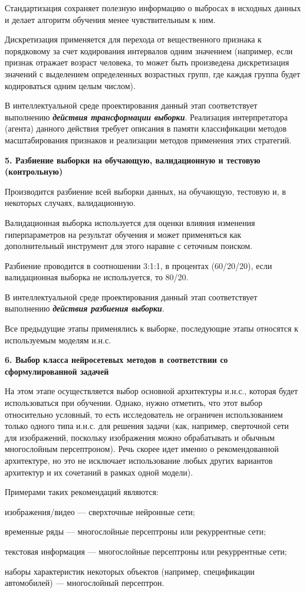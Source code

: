 Стандартизация сохраняет полезную информацию о выбросах в исходных данных и делает алгоритм обучения менее чувствительным к ним.

Дискретизация применяется для перехода от вещественного признака к порядковому за счет кодирования интервалов одним значением (например, если признак отражает возраст человека, то может быть произведена дискретизация значений с выделением определенных возрастных групп, где каждая группа будет кодироваться одним целым числом).

В интеллектуальной среде проектирования данный этап соответствует выполнению \textbf{\textit{действия трансформации выборки}}. Реализация интерпретатора (агента) данного действия требует описания в памяти классификации методов масштабирования признаков и реализации методов применения этих стратегий.


\textbf{5. Разбиение выборки на обучающую, валидационную и тестовую (контрольную)}

Производится разбиение всей выборки данных, на обучающую, тестовую и, в некоторых случаях, валидационную.

Валидационная выборка используется для оценки влияния изменения гиперпараметров на результат обучения и может применяться как дополнительный инструмент для этого наравне с сеточным поиском.

Разбиение проводится в соотношении 3:1:1, в процентах (60/20/20), если валидационная выборка не используется, то 80/20.

В интеллектуальной среде проектирования данный этап соответствует выполнению \textbf{\textit{действия разбиения выборки}}.

Все предыдущие этапы применялись к выборке, последующие этапы относятся к используемым моделям и.н.с.


\textbf{6. Выбор класса нейросетевых методов в соответствии со сформулированной задачей}

На этом этапе осуществляется выбор основной архитектуры и.н.с., которая будет использоваться при обучении. Однако, нужно отметить, что этот выбор относительно условный, то есть исследователь не ограничен использованием только одного типа и.н.с. для решения задачи (как, например, сверточной сети для изображений, поскольку изображения можно обрабатывать и обычным многослойным персептроном). Речь скорее идет именно о рекомендованной архитектуре, но это не исключает использование любых других вариантов архитектур и их сочетаний в рамках одной модели).

Примерами таких рекомендаций являются:
\begin{textitemize}
	\item изображения/видео --- сверхточные нейронные сети;
	\item временные ряды --- многослойные персептроны или рекуррентные сети;
	\item текстовая информация --- многослойные персептроны или рекуррентные сети;
	\item наборы характеристик некоторых объектов (например, спецификации автомобилей) --- многослойный персептрон.
\end{textitemize}


